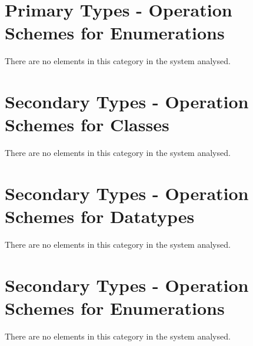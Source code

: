 \section{Primary Types - Operation Schemes for Enumerations}
There are no elements in this category in the system analysed.







\section{Secondary Types - Operation Schemes for Classes}
There are no elements in this category in the system analysed.





\section{Secondary Types - Operation Schemes for Datatypes}
There are no elements in this category in the system analysed.



\section{Secondary Types - Operation Schemes for Enumerations}
There are no elements in this category in the system analysed.


